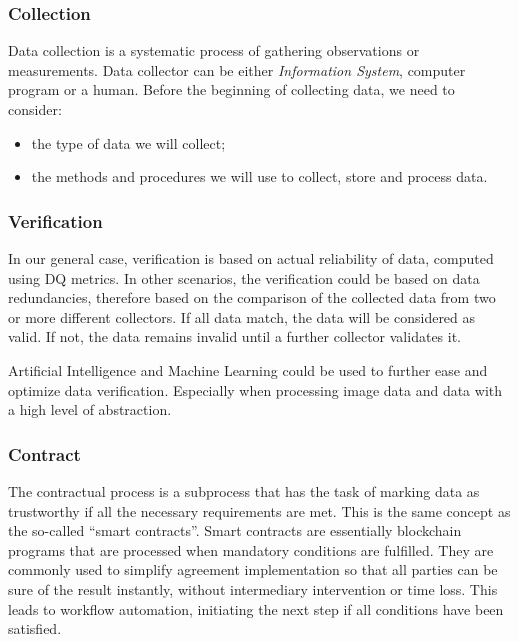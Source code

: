 \subsubsection{Collection}

Data collection is a systematic process of gathering observations or measurements.
Data collector can be either \textit{Information System}, computer program or a human.
Before the beginning of collecting data, we need to consider:

\begin{itemize}
    \item the type of data we will collect;
    \item the methods and procedures we will use to collect, store and process data.
\end{itemize}

\subsubsection{Verification}

In our general case, verification is based on actual reliability of data, computed using DQ metrics.
In other scenarios, the verification could be based on data redundancies, therefore based on the comparison of the collected data from two or more different collectors.
If all data match, the data will be considered as valid.
If not, the data remains invalid until a further collector validates it.

Artificial Intelligence and Machine Learning could be used to further ease and optimize data verification.
Especially when processing image data and data with a high level of abstraction.

\subsubsection{Contract}

The contractual process is a subprocess that has the task of marking data as trustworthy if all the necessary requirements are met.
This is the same concept as the so-called \enquote{smart contracts}.
Smart contracts are essentially blockchain programs that are processed when mandatory conditions are fulfilled.
They are commonly used to simplify agreement implementation so that all parties can be sure of the result instantly, without intermediary intervention or time loss.
This leads to workflow automation, initiating the next step if all conditions have been satisfied.

